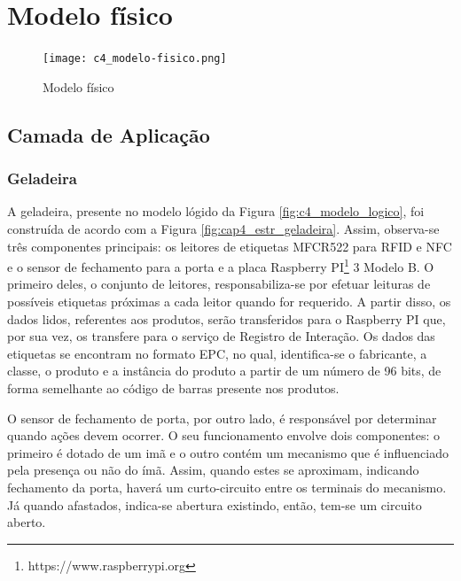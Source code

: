 \section{Modelo físico}


\begin{figure}[htb]
    \caption{Modelo físico}
    \label{fig:c4_modelo_fisico}
    \texttt{[image: c4\_modelo-fisico.png]}
\end{figure}

\subsection{Camada de Aplicação}

\subsubsection{Geladeira}

A geladeira, presente no modelo lógido da Figura \ref{fig:c4_modelo_logico}, foi construída de acordo com a Figura \ref{fig:cap4_estr_geladeira}. Assim, observa-se três componentes principais: os leitores de etiquetas MFCR522 para RFID e NFC e o sensor de fechamento para a porta e a placa Raspberry PI\textsuperscript{\textregistered}\footnote{https://www.raspberrypi.org} 3 Modelo B. O primeiro deles, o conjunto de leitores, responsabiliza-se por efetuar leituras de possíveis etiquetas próximas a cada leitor quando for requerido. A partir disso, os dados lidos, referentes aos produtos, serão transferidos para o Raspberry PI que, por sua vez, os transfere para o serviço de Registro de Interação. Os dados das etiquetas se encontram no formato EPC, no qual, identifica-se o fabricante, a classe, o produto e a instância do produto a partir de um número de 96 bits, de forma semelhante ao código de barras presente nos produtos.

O sensor de fechamento de porta, por outro lado, é responsável por determinar quando ações devem ocorrer. O seu funcionamento envolve dois componentes: o primeiro é dotado de um imã e o outro contém um mecanismo que é influenciado pela presença ou não do ímã. Assim, quando estes se aproximam, indicando fechamento da porta, haverá um curto-circuito entre os terminais do mecanismo. Já quando afastados, indica-se abertura existindo, então, tem-se um circuito aberto.

